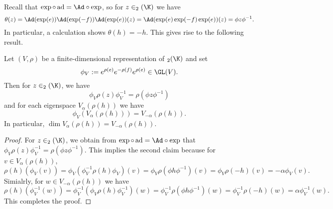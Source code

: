 Recall that $\exp\circ\,\mathrm{ad}=\Ad\circ\exp$, so for $z\in\sl_2(\K)$ we have
\[\theta(z)=\Ad(\exp(e))\Ad(\exp(-f))\Ad(\exp(e))(z)=\Ad(\exp(e)\exp(-f)\exp(e))(z)=\phi z\phi^{-1}.\]
In particular, a calculation shows $\theta(h)=-h$. This gives rise to the following result.
\begin{proposition}\label{sl_2(K)-module eigenspace of h}
Let $(V,\rho)$ be a finite-dimensional representation of $\sl_2(\K)$ and set
\[\phi_V:=e^{\rho(e)}e^{-\rho(f)}e^{\rho(e)}\in\GL(V).\]
Then for $z\in\sl_2(\K)$, we have
\[\phi_V\rho(z)\phi_V^{-1}=\rho(\phi z\phi^{-1})\]
and for each eigenspace $V_\alpha(\rho(h))$ we have
\[\phi_V(V_\alpha(\rho(h)))=V_{-\alpha}(\rho(h)).\]
In particular, $\dim V_\alpha(\rho(h))=V_{-\alpha}(\rho(h))$.
\end{proposition}
\begin{proof}
For $z\in\sl_2(\K)$, we obtain from $\exp\circ\,\mathrm{ad}=\Ad\circ\exp$ that $\phi_V\rho(z)\phi_V^{-1}=\rho(\phi z\phi^{-1})$. This implies the second claim because for $v\in V_\alpha(\rho(h))$,
\[\rho(h)(\phi_V(v))=\phi_V(\phi_V^{-1}\rho(h)\phi_V)(v)=\phi_V\rho(\phi h\phi^{-1})(v)=\phi_V\rho(-h)(v)=-\alpha\phi_V(v).\]
Simialrly, for $w\in V_{-\alpha}(\rho(h))$ we have
\[\rho(h)(\phi_V^{-1}(w))=\phi_V^{-1}(\phi_V\rho(h)\phi_V^{-1})(w)=\phi_V^{-1}\rho(\phi h\phi^{-1})(w)=\phi_V^{-1}\rho(-h)(w)=\alpha\phi_V^{-1}(w).\]
This completes the proof.
\end{proof}